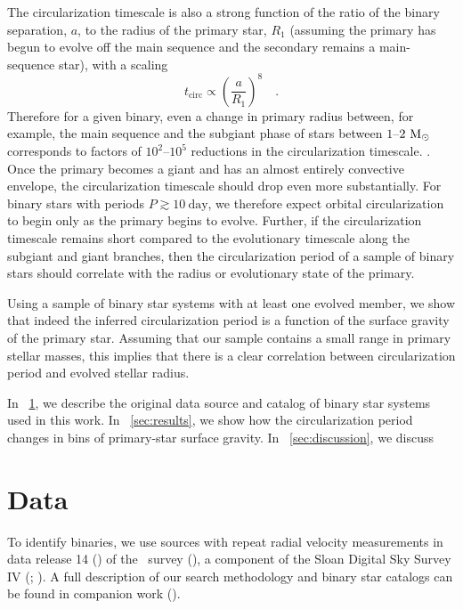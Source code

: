 \documentclass[modern, letterpaper]{aastex62}
\newcommand{\apogee}{\project{\acronym{APOGEE}}}
\newcommand{\sdssiv}{\project{\acronym{SDSS-IV}}}
\newcommand{\DR}{\acronym{DR14}}
\begin{document}
The circularization timescale is also a strong function of the ratio of the
binary separation, $a$, to the radius of the primary star, $R_1$ (assuming the
primary has begun to evolve off the main sequence and the secondary remains a
main-sequence star), with a scaling
\begin{equation}
    t_\textrm{circ} \propto \left(\frac{a}{R_1}\right)^8 \quad .
\end{equation}
Therefore for a given binary, even a change in primary radius between, for
example, the main sequence and the subgiant phase of stars between
$1$--$2~\mathrm{M}_\odot$ corresponds to factors of $10^2$--$10^5$ reductions in the
circularization timescale. .
Once the primary becomes a giant and has an almost entirely convective envelope,
the circularization timescale should drop even more substantially.
For binary stars with periods $P \gtrsim 10~\textrm{day}$, we therefore expect
orbital circularization to begin only as the primary begins to evolve.
Further, if the circularization timescale remains short compared to the
evolutionary timescale along the subgiant and giant branches, then the
circularization period of a sample of binary stars should correlate with the
radius or evolutionary state of the primary.

Using a sample of binary star systems with at least one evolved member, we show
that indeed the inferred circularization period is a function of the surface
gravity of the primary star.
Assuming that our sample contains a small range in primary stellar masses, this
implies that there is a clear correlation between circularization period and
evolved stellar radius.

In \sectionname~\ref{sec:data}, we describe the original data source and catalog
of binary star systems used in this work.
In \sectionname~\ref{sec:results}, we show how the circularization period changes in bins of primary-star surface gravity.
In \sectionname~\ref{sec:discussion}, we discuss 

\section{Data} \label{sec:data}

To identify binaries, we use sources with repeat radial velocity measurements in
data release 14 (\DR) of the \apogee\ survey
(\citealt{Majewski:2017,Abolfathi:2017}), a component of the Sloan Digital Sky
Survey IV (\sdssiv; \citealt{Gunn:2006,Blanton:2017}).
A full description of our search methodology and binary star catalogs can be
found in companion work (\citealt{Price-Whelan:2018}).
\end{document}
